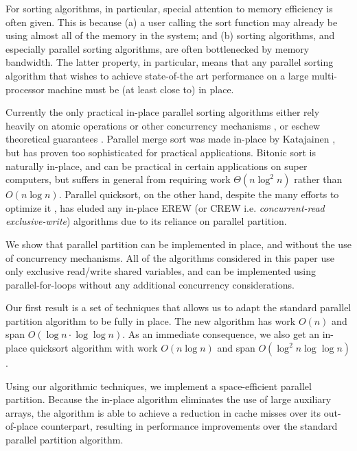 \documentclass[journal, onecolumn]{IEEEtran}
\begin{document}
For sorting algorithms, in particular, special attention to memory
efficiency is often given. This is because (a) a user calling the sort
function may already be using almost all of the memory in the system;
and (b) sorting algorithms, and especially parallel sorting
algorithms, are often bottlenecked by memory bandwidth. The latter
property, in particular, means that any parallel sorting algorithm
that wishes to achieve state-of-the art performance on a large
multi-processor machine must be (at least close to) in place.

Currently the only practical in-place parallel sorting algorithms
either rely heavily on atomic operations or other concurrency
mechanisms \cite{HeidelbergerNo90, AxtmannWi17, TsigasZh03}, or eschew
theoretical guarantees \cite{FrancisPa92}. Parallel merge sort
\cite{Hagerup89} was made in-place by Katajainen \cite{Katajainen93},
but has proven too sophisticated for practical applications. Bitonic
sort \cite{BlellochLe98} is naturally in-place, and can be practical
in certain applications on super computers, but suffers in general
from requiring work $\Theta(n \log^2 n)$ rather than $O(n \log
n)$. Parallel quicksort, on the other hand, despite the many efforts
to optimize it \cite{HeidelbergerNo90, AxtmannWi17, TsigasZh03,
  FrancisPa92, Frias08}, has eluded any in-place EREW (or CREW i.e. \emph{concurrent-read exclusive-write})
algorithms due to its reliance on parallel partition.


We show that parallel partition can be implemented in place, and
without the use of concurrency mechanisms. All of the algorithms
considered in this paper use only exclusive read/write shared
variables, and can be implemented using parallel-for-loops without any
additional concurrency considerations. 

Our first result is a set of techniques that allows us to adapt the
standard parallel partition algorithm to be fully in place. The new
algorithm has work $O(n)$ and span $O(\log n \cdot \log \log n)$. As
an immediate consequence, we also get an in-place quicksort algorithm
with work $O(n \log n)$ and span $O(\log^2 n \log \log n)$.

Using our algorithmic techniques, we implement a space-efficient
parallel partition. Because the in-place algorithm eliminates the use
of large auxiliary arrays, the algorithm is able to achieve a
reduction in cache misses over its out-of-place counterpart, resulting
in performance improvements over the standard parallel partition
algorithm.
\end{document}
